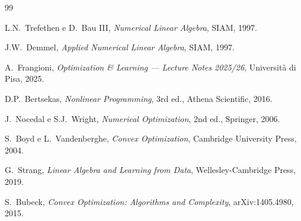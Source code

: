 \documentclass[11pt, a4paper, twoside]{book}
\theoremstyle{definition}
\theoremstyle{plain}
\theoremstyle{remark}
\begin{document}

\begin{thebibliography}{99}

L.N.\ Trefethen e D.\ Bau III, \emph{Numerical Linear Algebra}, SIAM, 1997.

J.W.\ Demmel, \emph{Applied Numerical Linear Algebra}, SIAM, 1997.

A.\ Frangioni, \emph{Optimization \& Learning --- Lecture Notes 2025/26}, Università di Pisa, 2025.

D.P.\ Bertsekas, \emph{Nonlinear Programming}, 3rd ed., Athena Scientific, 2016.

J.\ Nocedal e S.J.\ Wright, \emph{Numerical Optimization}, 2nd ed., Springer, 2006.

S.\ Boyd e L.\ Vandenberghe, \emph{Convex Optimization}, Cambridge University Press, 2004.

G.\ Strang, \emph{Linear Algebra and Learning from Data}, Wellesley-Cambridge Press, 2019.

S.\ Bubeck, \emph{Convex Optimization: Algorithms and Complexity}, arXiv:1405.4980, 2015.

\end{thebibliography}
\end{document}
